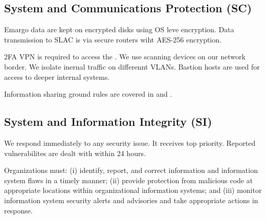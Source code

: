 \subsection{System and Communications Protection (SC)} \label{sec:SC}
Emargo data are kept on encrypted disks using OS leve encryption.
Data transmission to SLAC is via  secure routers wiht AES-256 encryption.

2FA VPN is required to access the \PZ.
We use scanning devices on our network border.
We isolate inernal traffic on differennt VLANs.
Bastion hosts are used for access to deeper internal systems.

Information sharing ground rules are  covered in  and .

\subsection{ System and Information Integrity (SI)} \label{sec:SI}
We respond immediately to any security issue.
It receives top priority.
Reported vulnerabilites are dealt with within 24 hours.

Organizations must: (i) identify, report, and correct information and
information system flaws in a timely manner; (ii) provide protection from malicious code at appropriate
locations within organizational information systems; and (iii) monitor information system security alerts
and advisories and take appropriate actions in response.
